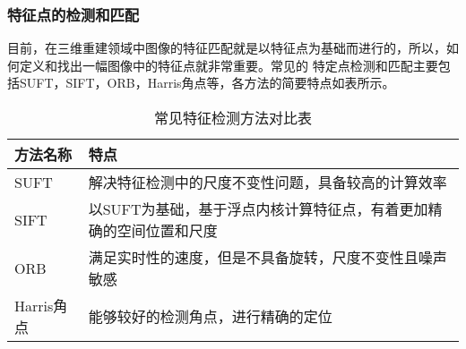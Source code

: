 \subsubsection{特征点的检测和匹配} 
\label{sec:3.2.2.2}
目前，在三维重建领域中图像的特征匹配就是以特征点为基础而进行的，所以，如何定义和找出一幅图像中的特征点就非常重要。常见的
特定点检测和匹配主要包括SUFT，SIFT，ORB，Harris角点等，各方法的简要特点如表所示。
\begin{table}[h]
    \centering
    \caption{常见特征检测方法对比表}
    \label{tab:Feature}
    \begin{tabular}{C{4.6cm}L{8.4cm}}
    \toprule
    \textbf{方法名称} & \textbf{特点}  \\
    \midrule
    SUFT&解决特征检测中的尺度不变性问题，具备较高的计算效率\\
    SIFT&以SUFT为基础，基于浮点内核计算特征点，有着更加精确的空间位置和尺度\\
    ORB&满足实时性的速度，但是不具备旋转，尺度不变性且噪声敏感\\
    Harris角点&能够较好的检测角点，进行精确的定位\\
    \bottomrule
    \end{tabular}
  \end{table}

